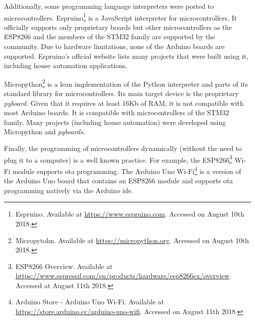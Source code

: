 Additionally, some programming language interpreters were ported to microcontrollers. Espruino\footnote{Espruino. Available at \url{https://www.espruino.com}. Accessed on August 10th 2018.} is a JavaScript interpreter for microcontrollers. It officially supports only proprietary boards but other microcontrollers as the ESP8266 and the members of the STM32 family are supported by the community. Due to hardware limitations, none of the Arduino boards are supported. Espruino's official website lists many projects that were built using it, including house automation applications. 

Micropython\footnote{Micropytohn. Available at \url{https://micropython.org}. Accessed on August 10th 2018.} is a lean implementation of the Python interpreter and parts of its standard library for microcontrollers. Its main target device is the proprietary \textit{pyboard}. Given that it requires at least 16Kb of RAM, it is not compatible with most Arduino boards. It is compatible with microcontrollers of the STM32 family. Many projects (including house automation) were developed using Micropython and \textit{pyboards}. 

Finally, the programming of microcontrollers dynamically (without the need to plug it to a computer) is a well known practice. For example, the ESP8266\footnote{ESP8266 Overview. Available at \url{https://www.espressif.com/en/products/hardware/esp8266ex/overview}. Accessed at August 11th 2018.} Wi-Fi module supports \ac{ota} programming. The Arduino Uno Wi-Fi\footnote{Arduino Store - Arduino Uno Wi-Fi. Available at \url{https://store.arduino.cc/arduino-uno-wifi}. Accessed on August 11th 2018.} is a version of the Arduino Uno board that contains an ESP8266 module and supports \ac{ota} programming natively via the Arduino \acs{ide}.